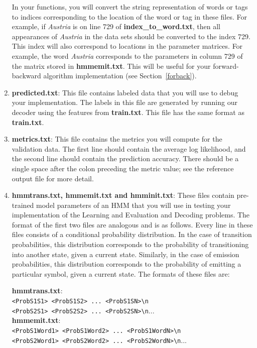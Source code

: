 \documentclass[11pt,addpoints,answers]{exam}
\begin{document}
\begin{enumerate}
In your functions, you will convert the string representation of words or tags to indices corresponding to the location of the word or tag in these files. For example, if \textit{Austria} is on line 729 of \textbf{index\_to\_word.txt}, then all appearances of \textit{Austria} in the data sets should be converted to the index 729. This index will also correspond to locations in the parameter matrices. For example, the word \textit{Austria} corresponds to the parameters in column 729 of the matrix stored in \textbf{hmmemit.txt}. This will be useful for your forward-backward algorithm implementation (see Section~\ref{forback}).

\item \textbf{predicted.txt}: This file contains labeled data that you will use to debug your implementation. The labels in this file are generated by running our decoder using the features from \textbf{train.txt}. This file has the same format as \textbf{train.txt}.

\item \textbf{metrics.txt}: This file contains the metrics you will compute for the validation data. The first line should contain the average log likelihood, and the second line should contain the prediction accuracy. There should be a single space after the colon preceding the metric value; see the reference output file for more detail.  

\clearpage
\item \textbf{hmmtrans.txt, hmmemit.txt and hmminit.txt}: These files contain pre-trained model parameters of an HMM that you will use in testing your implementation of the Learning and Evaluation and Decoding problems. The format of the first two files are analogous and is as follows. Every line in these files consists of a conditional probability distribution. In the case of transition probabilities, this distribution corresponds to the probability of transitioning into another state, given a current state. Similarly, in the case of emission probabilities, this distribution corresponds to the probability of emitting a particular symbol, given a current state. The formats of these files are:
    
    \textbf{hmmtrans.txt}:\\
    \texttt{<ProbS1S1> <ProbS1S2> ... <ProbS1SN>\textbackslash n}\\
     \texttt{<ProbS2S1> <ProbS2S2> ... <ProbS2SN>\textbackslash n}...\\   
    
    \textbf{hmmemit.txt}:\\
    \texttt{<ProbS1Word1> <ProbS1Word2> ... <ProbS1WordN>\textbackslash n}\\
     \texttt{<ProbS2Word1> <ProbS2Word2> ... <ProbS2WordN>\textbackslash n}...
     

\end{enumerate}
\end{document}
